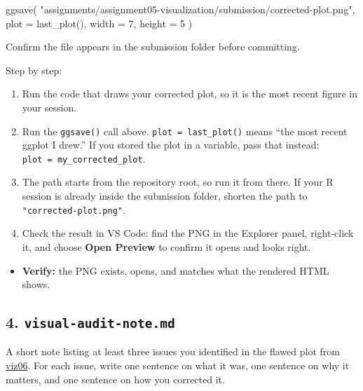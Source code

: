 \documentclass[
  letterpaper,
  DIV=11,
  numbers=noendperiod,
  oneside]{scrreprt}
\newenvironment{Shaded}{\begin{snugshade}}{\end{snugshade}}
\newcommand{\AttributeTok}[1]{\textcolor[rgb]{0.40,0.45,0.13}{#1}}
\newcommand{\DecValTok}[1]{\textcolor[rgb]{0.68,0.00,0.00}{#1}}
\newcommand{\FunctionTok}[1]{\textcolor[rgb]{0.28,0.35,0.67}{#1}}
\newcommand{\NormalTok}[1]{\textcolor[rgb]{0.00,0.23,0.31}{#1}}
\newcommand{\StringTok}[1]{\textcolor[rgb]{0.13,0.47,0.30}{#1}}
\providecommand{\tightlist}{%
  \setlength{\itemsep}{0pt}\setlength{\parskip}{0pt}}
\begin{document}
\begin{Shaded}
\begin{Highlighting}[numbers=left,,]
\FunctionTok{ggsave}\NormalTok{(}
  \StringTok{"assignments/assignment05{-}visualization/submission/corrected{-}plot.png"}\NormalTok{,}
  \AttributeTok{plot =} \FunctionTok{last\_plot}\NormalTok{(),}
  \AttributeTok{width =} \DecValTok{7}\NormalTok{,}
  \AttributeTok{height =} \DecValTok{5}
\NormalTok{)}
\end{Highlighting}
\end{Shaded}

Confirm the file appears in the submission folder before committing.

Step by step:

\begin{enumerate}
\def\labelenumi{\arabic{enumi}.}
\tightlist
\item
  Run the code that draws your corrected plot, so it is the most recent
  figure in your session.
\item
  Run the \texttt{ggsave()} call above. \texttt{plot\ =\ last\_plot()}
  means ``the most recent ggplot I drew.'' If you stored the plot in a
  variable, pass that instead: \texttt{plot\ =\ my\_corrected\_plot}.
\item
  The path starts from the repository root, so run it from there. If
  your R session is already inside the submission folder, shorten the
  path to \texttt{"corrected-plot.png"}.
\item
  Check the result in VS Code: find the PNG in the Explorer panel,
  right-click it, and choose \textbf{Open Preview} to confirm it opens
  and looks right.
\end{enumerate}

\begin{itemize}
\tightlist
\item
  \textbf{Verify:} the PNG exists, opens, and matches what the rendered
  HTML shows.
\end{itemize}

\subsection*{\texorpdfstring{4.
\texttt{visual-audit-note.md}}{4. visual-audit-note.md}}\label{visual-audit-note.md}

A short note listing at least three issues you identified in the flawed
plot from \hyperref[in-class-studio-ai-visual-audit]{viz06}. For each
issue, write one sentence on what it was, one sentence on why it
matters, and one sentence on how you corrected it.
\end{document}

